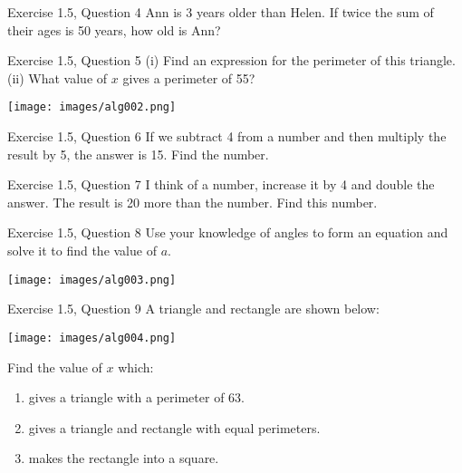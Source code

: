 \documentclass[leqno,usenames,dvipsnames,14pt]{beamer}
\begin{document}
\begin{frame}{Exercise 1.5, Question 4}
\Large
  Ann is 3 years older than Helen. If twice the sum of their ages is 50 years, how old is Ann?
\end{frame}

\begin{frame}{Exercise 1.5, Question 5}
\Large
  (i) Find an expression for the perimeter of this triangle.\\
  (ii) What value of \( x \) gives a perimeter of 55?

  \begin{center}
    \texttt{[image: images/alg002.png]}
  \end{center}
\end{frame}

\begin{frame}{Exercise 1.5, Question 6}
\Large
  If we subtract 4 from a number and then multiply the result by 5, the answer is 15. Find the number.
\end{frame}

\begin{frame}{Exercise 1.5, Question 7}
\Large
  I think of a number, increase it by 4 and double the answer. The result is 20 more than the number. Find this number.
\end{frame}

\begin{frame}{Exercise 1.5, Question 8}
\Large
  Use your knowledge of angles to form an equation and solve it to find the value of \( a \).

  \begin{center}
    \texttt{[image: images/alg003.png]}
  \end{center}
\end{frame}

\begin{frame}{Exercise 1.5, Question 9}
\Large
  A triangle and rectangle are shown below:

  \begin{center}
    \texttt{[image: images/alg004.png]}
  \end{center}
  
  Find the value of \( x \) which:
  \begin{enumerate}
    \item gives a triangle with a perimeter of 63.
    \item gives a triangle and rectangle with equal perimeters.
    \item makes the rectangle into a square.
  \end{enumerate}
\end{frame}
\end{document}
